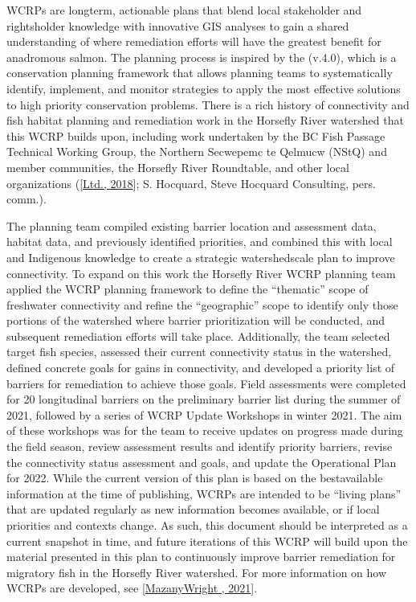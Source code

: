 \documentclass[letterpaper,10pt,english]{jupyterBook}
\begin{document}
\sphinxAtStartPar
WCRPs are long\sphinxhyphen{}term, actionable plans that blend local stakeholder and rightsholder knowledge with innovative GIS analyses to gain a shared understanding of where remediation efforts will have the greatest benefit for anadromous salmon. The planning process is inspired by the  (v.4.0), which is a conservation planning framework that allows planning teams to systematically identify, implement, and monitor strategies to apply the most effective solutions to high priority conservation problems. There is a rich history of connectivity and fish habitat planning and remediation work in the Horsefly River watershed that this WCRP builds upon, including work undertaken by the BC Fish Passage Technical Working Group, the Northern Secwepemc te Qelmucw (NStQ) and member communities, the Horsefly River Roundtable, and other local organizations ({[}\hyperlink{cite.references:id17}{Ltd., 2018}{]}; S. Hocquard, Steve Hocquard Consulting, pers. comm.).

\sphinxAtStartPar
The planning team compiled existing barrier location and assessment data, habitat data, and previously identified priorities, and combined this with local and Indigenous knowledge to create a strategic watershed\sphinxhyphen{}scale plan to improve connectivity. To expand on this work the Horsefly River WCRP planning team applied the WCRP planning framework to define the “thematic” scope of freshwater connectivity and refine the “geographic” scope to identify only those portions of the watershed where barrier prioritization will be conducted, and subsequent remediation efforts will take place. Additionally, the team selected target fish species, assessed their current connectivity status in the watershed, defined concrete goals for gains in connectivity, and developed a priority list of barriers for remediation to achieve those goals. Field assessments were completed for 20 longitudinal barriers on the preliminary barrier list during the summer of 2021, followed by a series of WCRP Update Workshops in winter 2021. The aim of these workshops was for the team to receive updates on progress made during the field season, review assessment results and identify priority barriers, revise the connectivity status assessment and goals, and update the Operational Plan for 2022. While the current version of this plan is based on the best\sphinxhyphen{}available information at the time of publishing, WCRPs are intended to be “living plans” that are updated regularly as new information becomes available, or if local priorities and contexts change. As such, this document should be interpreted as a current snap\sphinxhyphen{}shot in time, and future iterations of this WCRP will build upon the material presented in this plan to continuously improve barrier remediation for migratory fish in the Horsefly River watershed. For more information on how WCRPs are developed, see {[}\hyperlink{cite.references:id14}{Mazany\sphinxhyphen{}Wright , 2021}{]}.
\end{document}
